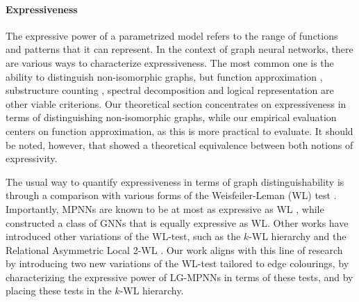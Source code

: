 \documentclass{article}
\begin{document}
\paragraph{Expressiveness}
The expressive power of a parametrized model refers to the range of functions and patterns that it can represent. 
In the context of graph neural networks, there are various ways to characterize expressiveness. The most common one is the ability to distinguish non-isomorphic graphs, but function approximation \cite{maron2019universality}, substructure counting \cite{chen2020can}, spectral decomposition \cite{balcilar2020analyzing} and logical representation \cite{barcelo2020logical} are other viable criterions. Our theoretical section concentrates on expressiveness in terms of distinguishing non-isomorphic graphs, while our empirical evaluation centers on function approximation, as this is more practical to evaluate. It should be noted, however, that \cite{chen2019equivalence} showed a theoretical equivalence between both notions of expressivity.

The usual way to quantify expressiveness in terms of graph distinguishability is through a comparison with various forms of the Weisfeiler-Leman (WL) test \cite{weisfeiler1968reduction}. Importantly, MPNNs are known to be at most as expressive as WL \cite{morris2019weisfeiler}, while \cite{xu2018powerful} constructed a class of GNNs that is equally expressive as WL. Other works have introduced other variations of the WL-test, such as the $k$-WL hierarchy \cite{morris2019weisfeiler} and the Relational Asymmetric Local 2-WL \cite{huang2024theory}.
Our work aligns with this line of research by introducing two new variations of the WL-test tailored to edge colourings, by characterizing the expressive power of LG-MPNNs in terms of these tests, and by placing these tests in the $k$-WL hierarchy.
\end{document}
